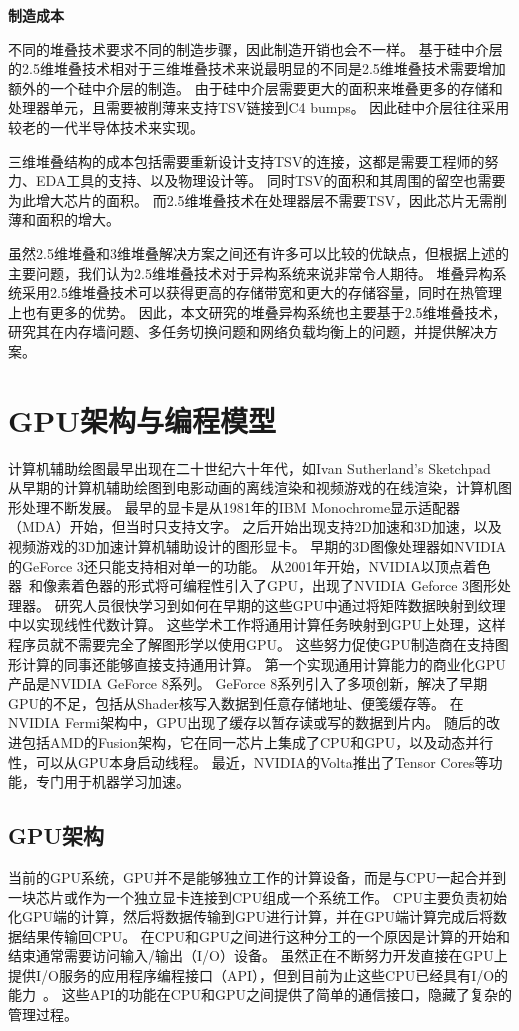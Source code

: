 \textbf{制造成本}

不同的堆叠技术要求不同的制造步骤，因此制造开销也会不一样。
基于硅中介层的2.5维堆叠技术相对于三维堆叠技术来说最明显的不同是2.5维堆叠技术需要增加额外的一个硅中介层的制造。
由于硅中介层需要更大的面积来堆叠更多的存储和处理器单元，且需要被削薄来支持TSV链接到C4 bumps。
因此硅中介层往往采用较老的一代半导体技术来实现。

三维堆叠结构的成本包括需要重新设计支持TSV的连接，这都是需要工程师的努力、EDA工具的支持、以及物理设计等。
同时TSV的面积和其周围的留空也需要为此增大芯片的面积。
而2.5维堆叠技术在处理器层不需要TSV，因此芯片无需削薄和面积的增大。

虽然2.5维堆叠和3维堆叠解决方案之间还有许多可以比较的优缺点，但根据上述的主要问题，我们认为2.5维堆叠技术对于异构系统来说非常令人期待。
堆叠异构系统采用2.5维堆叠技术可以获得更高的存储带宽和更大的存储容量，同时在热管理上也有更多的优势。
因此，本文研究的堆叠异构系统也主要基于2.5维堆叠技术，研究其在内存墙问题、多任务切换问题和网络负载均衡上的问题，并提供解决方案。

\section{GPU架构与编程模型}

计算机辅助绘图最早出现在二十世纪六十年代，如Ivan Sutherland's Sketchpad~\cite{sutherland1964sketchpad}
从早期的计算机辅助绘图到电影动画的离线渲染和视频游戏的在线渲染，计算机图形处理不断发展。
最早的显卡是从1981年的IBM Monochrome显示适配器（MDA）开始，但当时只支持文字。
之后开始出现支持2D加速和3D加速，以及视频游戏的3D加速计算机辅助设计的图形显卡。
早期的3D图像处理器如NVIDIA的GeForce 3还只能支持相对单一的功能。
从2001年开始，NVIDIA以顶点着色器~\cite{lindholm2001user}和像素着色器的形式将可编程性引入了GPU，出现了NVIDIA Geforce 3图形处理器。
研究人员很快学习到如何在早期的这些GPU中通过将矩阵数据映射到纹理中以实现线性代数计算。
这些学术工作将通用计算任务映射到GPU上处理，这样程序员就不需要完全了解图形学以使用GPU。
这些努力促使GPU制造商在支持图形计算的同事还能够直接支持通用计算。
第一个实现通用计算能力的商业化GPU产品是NVIDIA GeForce 8系列。 
GeForce 8系列引入了多项创新，解决了早期GPU的不足，包括从Shader核写入数据到任意存储地址、便笺缓存等。
在NVIDIA Fermi架构中，GPU出现了缓存以暂存读或写的数据到片内。
随后的改进包括AMD的Fusion架构，它在同一芯片上集成了CPU和GPU，以及动态并行性，可以从GPU本身启动线程。
最近，NVIDIA的Volta推出了Tensor Cores等功能，专门用于机器学习加速。

\subsection{GPU架构}
当前的GPU系统，GPU并不是能够独立工作的计算设备，而是与CPU一起合并到一块芯片或作为一个独立显卡连接到CPU组成一个系统工作。
CPU主要负责初始化GPU端的计算，然后将数据传输到GPU进行计算，并在GPU端计算完成后将数据结果传输回CPU。
在CPU和GPU之间进行这种分工的一个原因是计算的开始和结束通常需要访问输入/输出（I/O）设备。 
虽然正在不断努力开发直接在GPU上提供I/O服务的应用程序编程接口（API），但到目前为止这些CPU已经具有I/O的能力~\cite{silberstein2016gpunet}\cite{Silberstein:20139}。
这些API的功能在CPU和GPU之间提供了简单的通信接口，隐藏了复杂的管理过程。

